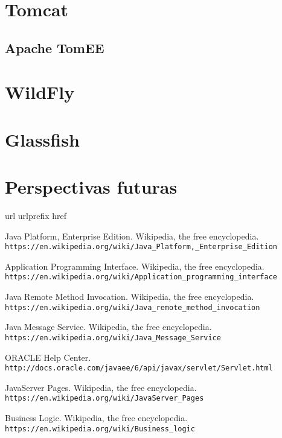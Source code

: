 \documentclass[a4paper, 10pt]{article}
\begin{document}
\section{Tomcat}

	\subsection{Apache TomEE}

\section{WildFly}


\section{Glassfish}

\section{Perspectivas futuras}

\newpage
\begin{thebibliography}{10}
\expandafter\ifx\csname url\endcsname\relax
  \def\url#1{\texttt{#1}}\fi
\expandafter\ifx\csname urlprefix\endcsname\relax\def\urlprefix{URL }\fi
\expandafter\ifx\csname href\endcsname\relax
  \def\href#1#2{#2} \def\path#1{#1}\fi

Java Platform, Enterprise Edition. Wikipedia, the free encyclopedia.\\
	\url{https://en.wikipedia.org/wiki/Java_Platform,_Enterprise_Edition}

Application Programming Interface. Wikipedia, the free encyclopedia.\\
	\url{https://en.wikipedia.org/wiki/Application_programming_interface}

Java Remote Method Invocation. Wikipedia, the free encyclopedia.\\
	\url{https://en.wikipedia.org/wiki/Java_remote_method_invocation}

Java Message Service. Wikipedia, the free encyclopedia.\\
	\url{https://en.wikipedia.org/wiki/Java_Message_Service}

ORACLE Help Center.\\
	\url{http://docs.oracle.com/javaee/6/api/javax/servlet/Servlet.html}

JavaServer Pages. Wikipedia, the free encyclopedia.\\
	\url{https://en.wikipedia.org/wiki/JavaServer_Pages}

Business Logic. Wikipedia, the free encyclopedia.\\
	\url{https://en.wikipedia.org/wiki/Business_logic}
\end{thebibliography}
\end{document}
